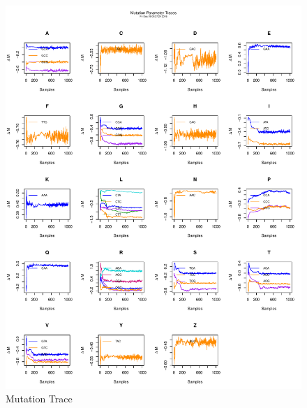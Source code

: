 \documentclass[11pt]{labbook}
\begin{document}
    \begin{figure}
        \centering
        \includegraphics[scale=.65]{FONSE_Plots/2016/December_8/mutation_trace}
        \caption{Mutation Trace}
        \label{fig:DEC8_MUT}
    \end{figure}
    
\end{document}
